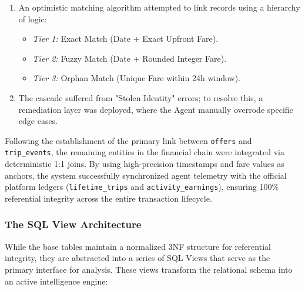 \begin{enumerate}
    \item An optimistic matching algorithm attempted to link records using a hierarchy of logic:
    \begin{itemize}
        \item \textit{Tier 1:} Exact Match (Date + Exact Upfront Fare).
        \item \textit{Tier 2:} Fuzzy Match (Date + Rounded Integer Fare).
        \item \textit{Tier 3:} Orphan Match (Unique Fare within 24h window).
    \end{itemize}
    \item The cascade suffered from "Stolen Identity" errors; to resolve this, a remediation layer was deployed, where the Agent manually overrode specific edge cases.
\end{enumerate}

Following the establishment of the primary link between \texttt{offers} and \texttt{trip\_events}, the remaining entities in the financial chain were integrated via deterministic 1:1 joins. By using high-precision timestamps and fare values as anchors, the system successfully synchronized agent telemetry with the official platform ledgers (\texttt{lifetime\_trips} and \texttt{activity\_earnings}), ensuring 100\% referential integrity across the entire transaction lifecycle.

\subsubsection{The SQL View Architecture}


While the base tables maintain a normalized 3NF structure for referential integrity, they are abstracted into a series of SQL Views that serve as the primary interface for analysis. These views transform the relational schema into an active intelligence engine:


